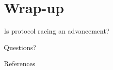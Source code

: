 \documentclass[aspectratio=169]{beamer}
\begin{document}
\section{Wrap-up}
\begin{frame}
  \centering
  \vfill
  {\LARGE Is protocol racing an advancement?}
  \vfill
\end{frame}

\begin{frame}
  \centering
  \vfill
  {\LARGE Questions?}
  \vfill
\end{frame}

\begin{frame}[allowframebreaks]{References}
  \printbibliography
\end{frame}
\end{document}
